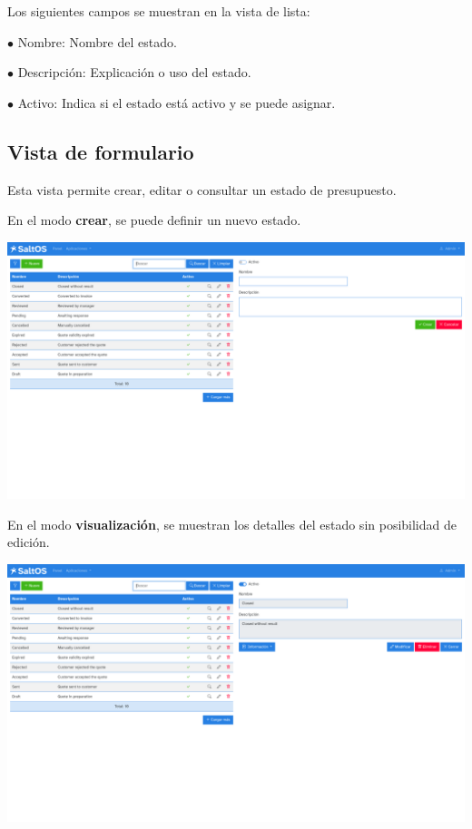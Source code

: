 \documentclass[a4paper]{article}
\begin{document}
Los siguientes campos se muestran en la vista de lista:

\begin{compactitem}
\item[\color{myblue}$\bullet$] Nombre: Nombre del estado.
\item[\color{myblue}$\bullet$] Descripción: Explicación o uso del estado.
\item[\color{myblue}$\bullet$] Activo: Indica si el estado está activo y se puede asignar.
\end{compactitem}

\hypertarget{toc79}{}
\subsection{Vista de formulario}

Esta vista permite crear, editar o consultar un estado de presupuesto.

En el modo \textbf{crear}, se puede definir un nuevo estado.

\begin{center}\includegraphics[width=1\textwidth]{../ujest/snaps/test-screenshots-js-screenshots-crm-quotes-status-create-es-es-1-snap.png}\end{center}

En el modo \textbf{visualización}, se muestran los detalles del estado sin posibilidad de edición.

\begin{center}\includegraphics[width=1\textwidth]{../ujest/snaps/test-screenshots-js-screenshots-crm-quotes-status-view-10-es-es-1-snap.png}\end{center}
\end{document}
